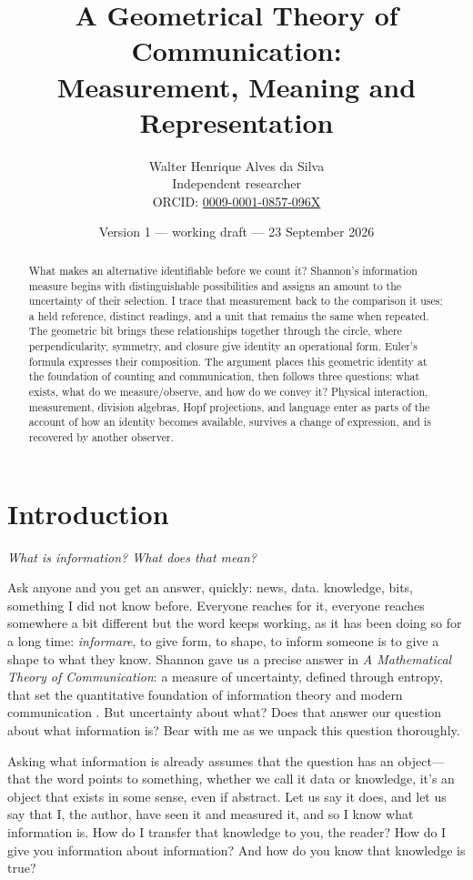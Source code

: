 \documentclass[11pt,a4paper]{article}
\title{A Geometrical Theory of Communication:\\
Measurement, Meaning and Representation}
\author{Walter Henrique Alves da Silva\\\small Independent researcher\\
\small ORCID: \href{https://orcid.org/0009-0001-0857-096X}{0009-0001-0857-096X}}
\date{Version 1 --- working draft --- 23 September 2026}
\theoremstyle{definition}
\begin{document}
\maketitle

\begin{abstract}
What makes an alternative identifiable before we count it? Shannon's
information measure begins with distinguishable possibilities and
assigns an amount to the uncertainty of their selection. I trace
that measurement back to the comparison it uses: a held reference,
distinct readings, and a unit that remains the same when repeated.
The geometric bit brings these relationships together through the
circle, where perpendicularity, symmetry, and closure give identity
an operational form. Euler's formula expresses their composition.
The argument places this geometric identity at the foundation of
counting and communication, then follows three questions: what
exists, what do we measure/observe, and how do we convey it?
Physical interaction, measurement, division algebras, Hopf projections,
and language enter as parts of the account of how an identity
becomes available, survives a change of expression, and is recovered
by another observer.
\end{abstract}

\section*{Introduction}
\label{sec:opening}

\emph{What is information? What does that mean?}

Ask anyone and you get an answer, quickly: news, data. knowledge, bits,
something I did not know before. Everyone reaches for it, everyone
reaches somewhere a bit different but the word keeps working, as it has been
doing so for a long time: \emph{informare}, to give form, to shape, to
inform someone is to give a shape to what they know. Shannon gave us a precise
answer in \emph{A Mathematical Theory of Communication}: a measure of
uncertainty, defined through entropy, that set the quantitative
foundation of information theory and modern communication
\citep{Shannon1948}. But uncertainty about what? Does that answer our question about what information is? Bear with me as we unpack this question thoroughly.

Asking what information is already assumes that the question has an
object---that the word points to something, whether we call it data or
knowledge, it's an object that exists in some sense, even if abstract. Let us say it does, and let us say that I, the author, have
seen it and measured it, and so I know what information is. How do I
transfer that knowledge to you, the reader? How do I give you
information about information? And how do you know that knowledge is true?
\end{document}
